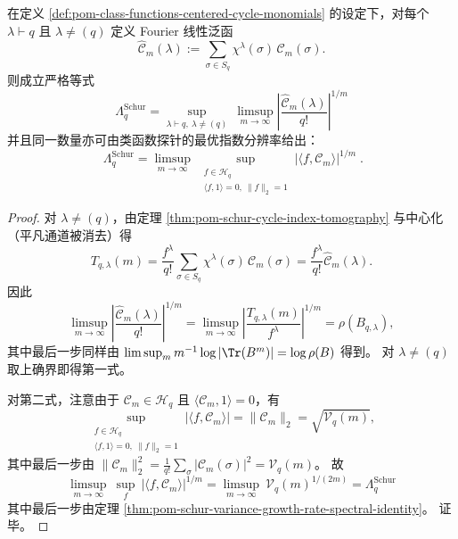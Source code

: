 \begin{theorem}\label{thm:pom-schur-envelope-variational-characterization}
在定义 \ref{def:pom-class-functions-centered-cycle-monomials} 的设定下，对每个 \(\lambda\vdash q\) 且 \(\lambda\neq(q)\) 定义 Fourier 线性泛函
\[
\widehat{\mathcal C}_m(\lambda):=\sum_{\sigma\in S_q}\chi^\lambda(\sigma)\,\mathcal C_m(\sigma).
\]
则成立严格等式
\[
\boxed{\;
\Lambda_q^{\mathrm{Schur}}
=
\sup_{\lambda\vdash q,\ \lambda\neq(q)}\ \limsup_{m\to\infty}\left|\frac{\widehat{\mathcal C}_m(\lambda)}{q!}\right|^{1/m}\;}
\]
并且同一数量亦可由类函数探针的最优指数分辨率给出：
\[
\boxed{\;
\Lambda_q^{\mathrm{Schur}}
=
\limsup_{m\to\infty}\ \sup_{\substack{f\in\mathcal H_q\\ \langle f,1\rangle=0,\ \|f\|_2=1}}
\left|\langle f,\mathcal C_m\rangle\right|^{1/m}\; } .
\]
\end{theorem}
\begin{proof}
对 \(\lambda\neq(q)\)，由定理 \ref{thm:pom-schur-cycle-index-tomography} 与中心化（平凡通道被消去）得
\[
T_{q,\lambda}(m)
=\frac{f^\lambda}{q!}\sum_{\sigma\in S_q}\chi^\lambda(\sigma)\,\mathcal C_m(\sigma)
=\frac{f^\lambda}{q!}\widehat{\mathcal C}_m(\lambda).
\]
因此
\[
\limsup_{m\to\infty}\left|\frac{\widehat{\mathcal C}_m(\lambda)}{q!}\right|^{1/m}
=
\limsup_{m\to\infty}\left|\frac{T_{q,\lambda}(m)}{f^\lambda}\right|^{1/m}
=
\rho(B_{q,\lambda}),
\]
其中最后一步同样由 \(\limsup_m m^{-1}\log|\Tr(B^m)|=\log\rho(B)\) 得到。
对 \(\lambda\neq(q)\) 取上确界即得第一式。
\par
对第二式，注意由于 \(\mathcal C_m\in\mathcal H_q\) 且 \(\langle \mathcal C_m,1\rangle=0\)，有
\[
\sup_{\substack{f\in\mathcal H_q\\ \langle f,1\rangle=0,\ \|f\|_2=1}}
|\langle f,\mathcal C_m\rangle|
=\|\mathcal C_m\|_2
=\sqrt{\mathcal V_q(m)},
\]
其中最后一步由 \(\|\mathcal C_m\|_2^2=\frac1{q!}\sum_\sigma|\mathcal C_m(\sigma)|^2=\mathcal V_q(m)\)。
故
\[
\limsup_{m\to\infty}\ \sup_{f}\ |\langle f,\mathcal C_m\rangle|^{1/m}
=\limsup_{m\to\infty}\ \mathcal V_q(m)^{1/(2m)}
=\Lambda_q^{\mathrm{Schur}}
\]
其中最后一步由定理 \ref{thm:pom-schur-variance-growth-rate-spectral-identity}。
证毕。
\end{proof}

\endinput

